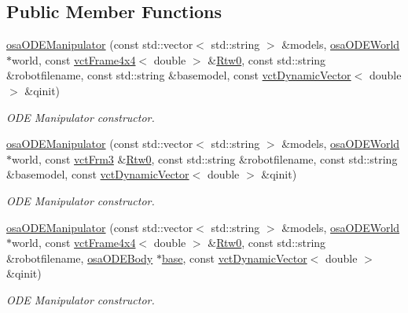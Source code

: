\subsection*{Public Member Functions}
\begin{DoxyCompactItemize}
\item 
\hyperlink{classosa_o_d_e_manipulator_a07b1139498e822a3a2506b91b92d2afa}{osa\-O\-D\-E\-Manipulator} (const std\-::vector$<$ std\-::string $>$ \&models, \hyperlink{classosa_o_d_e_world}{osa\-O\-D\-E\-World} $\ast$world, const \hyperlink{classvct_frame4x4}{vct\-Frame4x4}$<$ double $>$ \&\hyperlink{classrob_manipulator_ab48d9d9a166bf252698bc35788ca6ad6}{Rtw0}, const std\-::string \&robotfilename, const std\-::string \&basemodel, const \hyperlink{classvct_dynamic_vector}{vct\-Dynamic\-Vector}$<$ double $>$ \&qinit)
\begin{DoxyCompactList}\small\item\em O\-D\-E Manipulator constructor. \end{DoxyCompactList}\item 
\hyperlink{classosa_o_d_e_manipulator_ab21797024ebad02a81d0b2add3b08e84}{osa\-O\-D\-E\-Manipulator} (const std\-::vector$<$ std\-::string $>$ \&models, \hyperlink{classosa_o_d_e_world}{osa\-O\-D\-E\-World} $\ast$world, const \hyperlink{vct_transformation_types_8h_a81feda0a02c2d1bc26e5553f409fed20}{vct\-Frm3} \&\hyperlink{classrob_manipulator_ab48d9d9a166bf252698bc35788ca6ad6}{Rtw0}, const std\-::string \&robotfilename, const std\-::string \&basemodel, const \hyperlink{classvct_dynamic_vector}{vct\-Dynamic\-Vector}$<$ double $>$ \&qinit)
\begin{DoxyCompactList}\small\item\em O\-D\-E Manipulator constructor. \end{DoxyCompactList}\item 
\hyperlink{classosa_o_d_e_manipulator_a3675eabc662208f7f5a7720abbcb9382}{osa\-O\-D\-E\-Manipulator} (const std\-::vector$<$ std\-::string $>$ \&models, \hyperlink{classosa_o_d_e_world}{osa\-O\-D\-E\-World} $\ast$world, const \hyperlink{classvct_frame4x4}{vct\-Frame4x4}$<$ double $>$ \&\hyperlink{classrob_manipulator_ab48d9d9a166bf252698bc35788ca6ad6}{Rtw0}, const std\-::string \&robotfilename, \hyperlink{classosa_o_d_e_body}{osa\-O\-D\-E\-Body} $\ast$\hyperlink{classosa_o_s_g_manipulator_a6c69fd718f80ec8c73a408f01d2819ef}{base}, const \hyperlink{classvct_dynamic_vector}{vct\-Dynamic\-Vector}$<$ double $>$ \&qinit)
\begin{DoxyCompactList}\small\item\em O\-D\-E Manipulator constructor. \end{DoxyCompactList}\item 

\end{DoxyCompactItemize}
